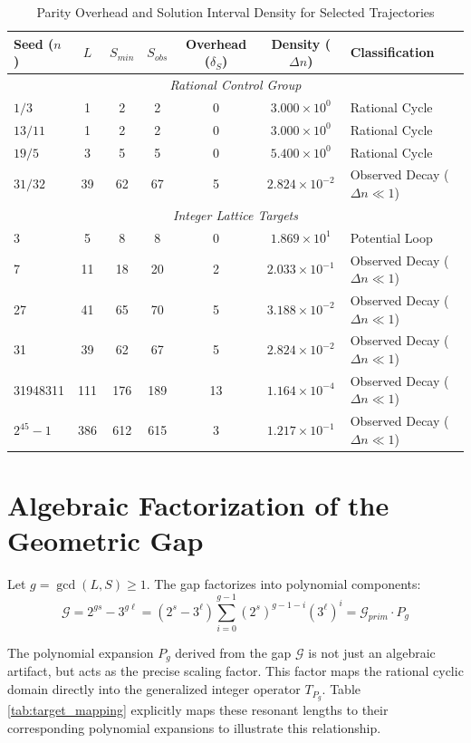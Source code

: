 \documentclass[11pt, a4paper]{article}
\theoremstyle{definition}
\begin{document}
\begin{table}[htbp]
\centering
\caption{Parity Overhead and Solution Interval Density for Selected Trajectories}
\label{tab:interval_collapse}
\begin{tabular}{l c c c c c l}
\toprule
Seed ($n$) & $L$ & $S_{min}$ & $S_{obs}$ & Overhead ($\delta_S$) & Density ($\Delta n$) & Classification \\ \midrule
\multicolumn{7}{c}{\textit{Rational Control Group}} \\
$1/3$ & 1 & 2 & 2 & 0 & $3.000 \times 10^{0}$ & Rational Cycle \\
$13/11$ & 1 & 2 & 2 & 0 & $3.000 \times 10^{0}$ & Rational Cycle \\
$19/5$ & 3 & 5 & 5 & 0 & $5.400 \times 10^{0}$ & Rational Cycle \\ 
$31/32$ & 39 & 62 & 67 & 5 & $2.824 \times 10^{-2}$ & Observed Decay ($\Delta n \ll 1$) \\ \midrule
\multicolumn{7}{c}{\textit{Integer Lattice Targets}} \\
3 & 5 & 8 & 8 & 0 & $1.869 \times 10^{1}$ & Potential Loop \\
7 & 11 & 18 & 20 & 2 & $2.033 \times 10^{-1}$ & Observed Decay ($\Delta n \ll 1$) \\
27 & 41 & 65 & 70 & 5 & $3.188 \times 10^{-2}$ & Observed Decay ($\Delta n \ll 1$) \\
31 & 39 & 62 & 67 & 5 & $2.824 \times 10^{-2}$ & Observed Decay ($\Delta n \ll 1$) \\
31948311 & 111 & 176 & 189 & 13 & $1.164 \times 10^{-4}$ & Observed Decay ($\Delta n \ll 1$) \\
$2^{45} - 1$ & 386 & 612 & 615 & 3 & $1.217 \times 10^{-1}$ & Observed Decay ($\Delta n \ll 1$) \\
\bottomrule
\end{tabular}
\end{table}

\section{Algebraic Factorization of the Geometric Gap}

Let $g = \gcd(L, S) \ge 1$. The gap factorizes into polynomial components:
\begin{equation}
\mathcal{G} = 2^{gs} - 3^{g\ell} = (2^s - 3^\ell) \sum_{i=0}^{g-1} (2^s)^{g-1-i} (3^\ell)^i = \mathcal{G}_{prim} \cdot P_g
\end{equation}

The polynomial expansion $P_g$ derived from the gap $\mathcal{G}$ is not just an algebraic artifact, but acts as the precise scaling factor. This factor maps the rational cyclic domain directly into the generalized integer operator $T_{P_g}$. Table \ref{tab:target_mapping} explicitly maps these resonant lengths to their corresponding polynomial expansions to illustrate this relationship.
\end{document}
